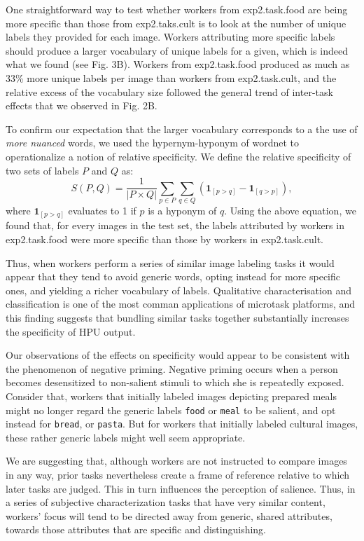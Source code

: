 \documentclass[12pt]{article}
\begin{document}
One straightforward way to test whether workers from exp2.task.food are 
being more specific than those from exp2.taks.cult is to look at the number 
of unique labels they provided for each image.  Workers attributing more
specific labels should produce a larger vocabulary of unique labels for a 
given, which is indeed what we found (see Fig. 3B).  Workers from 
exp2.task.food produced as much as 33\% more unique labels per image than 
workers from exp2.task.cult, and the relative excess of the vocabulary size
followed the general trend of inter-task effects that we observed in 
Fig. 2B.

To confirm our expectation that the larger vocabulary corresponds to a 
the use of \textit{more nuanced} words, we used the 
hypernym-hyponym of wordnet to operationalize a notion of relative 
specificity.  We define the relative specificity of two sets of labels $P$ 
and $Q$ as:
$$
	S(P,Q) = \frac{1}{|P \times Q|}\sum_{p \in P} \sum_{q \in Q} 
		\left(\mathbf{1}_{[p>q]} - \mathbf{1}_{[q>p]}\right),
$$
where $\mathbf{1}_{[p>q]}$ evaluates to 1 if $p$ is a hyponym of $q$.
Using the above equation, we found that, for every images in the 
test set, the labels attributed by workers in exp2.task.food were more 
specific than those by workers in exp2.task.cult.

Thus, when workers perform a series of similar image labeling tasks it would
appear that they tend to avoid generic words, opting instead for more specific
ones, and yielding a richer vocabulary of labels.  Qualitative 
characterisation and classification is one of the most comman applications of 
microtask platforms, and this finding suggests that bundling similar tasks 
together substantially increases the specificity of HPU output. 

Our observations of the effects on specificity would appear to be consistent
with the phenomenon of negative priming.
Negative priming occurs when a person becomes desensitized to non-salient 
stimuli to which she is repeatedly exposed. Consider that, workers that 
initially labeled images depicting prepared meals might no longer
regard the generic labels \texttt{food} or \texttt{meal} to be salient, and 
opt instead for \texttt{bread}, or \texttt{pasta}.  But for workers that
initially labeled cultural images, these rather generic labels might well seem
appropriate.
 
We are suggesting that, although workers are not instructed to compare images 
in any way, prior tasks nevertheless create a frame of reference relative to 
which later tasks are judged. This in turn influences the perception of 
salience. Thus, in a series of subjective characterization tasks that have 
very similar content, workers' focus will tend to be directed away from 
generic, shared attributes, towards those attributes that are specific and 
distinguishing.
\end{document}
